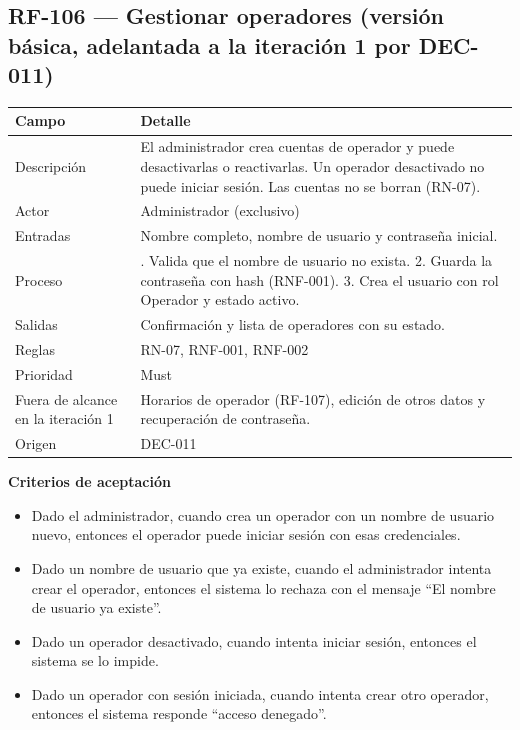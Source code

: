 \subsection{RF-106 — Gestionar operadores (versión básica, adelantada a la iteración 1 por DEC-011)}
\begin{longtable}{>{\raggedright\arraybackslash}p{3.2cm}>{\raggedright\arraybackslash}p{11.2cm}}
\toprule
\textbf{Campo} & \textbf{Detalle}\\
\midrule\endhead
Descripción & El administrador crea cuentas de operador y puede desactivarlas o reactivarlas. Un operador desactivado no puede iniciar sesión. Las cuentas no se borran (RN-07).\\
Actor & Administrador (exclusivo)\\
Entradas & Nombre completo, nombre de usuario y contraseña inicial.\\
Proceso & 1. Valida que el nombre de usuario no exista. 2. Guarda la contraseña con hash (RNF-001). 3. Crea el usuario con rol Operador y estado activo.\\
Salidas & Confirmación y lista de operadores con su estado.\\
Reglas & RN-07, RNF-001, RNF-002\\
Prioridad & Must\\
Fuera de alcance en la iteración 1 & Horarios de operador (RF-107), edición de otros datos y recuperación de contraseña.\\
Origen & [U] DEC-011\\
\bottomrule
\end{longtable}

\textbf{Criterios de aceptación}
\begin{itemize}
  \item Dado el administrador, cuando crea un operador con un nombre de usuario nuevo, entonces el operador puede iniciar sesión con esas credenciales.
  \item Dado un nombre de usuario que ya existe, cuando el administrador intenta crear el operador, entonces el sistema lo rechaza con el mensaje ``El nombre de usuario ya existe''.
  \item Dado un operador desactivado, cuando intenta iniciar sesión, entonces el sistema se lo impide.
  \item Dado un operador con sesión iniciada, cuando intenta crear otro operador, entonces el sistema responde ``acceso denegado''.
\end{itemize}

